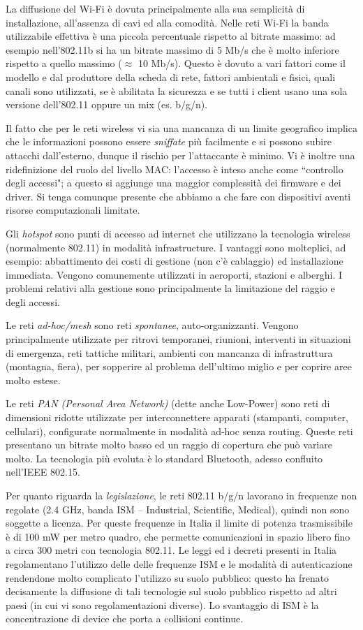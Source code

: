 La diffusione del Wi-Fi è dovuta principalmente alla sua semplicità di installazione, all'assenza di cavi ed alla comodità. Nelle reti Wi-Fi la banda utilizzabile effettiva è una piccola percentuale rispetto al bitrate massimo: ad esempio nell'802.11b si ha un bitrate massimo di 5 Mb/s che è molto inferiore rispetto a quello massimo ($\approx$ 10 Mb/s). Questo è dovuto a vari fattori come il modello e dal produttore della scheda di rete, fattori ambientali e fisici, quali canali sono utilizzati, se è abilitata la sicurezza e se tutti i client usano una sola versione dell'802.11 oppure un mix (es. b/g/n).

Il fatto che per le reti wireless vi sia una mancanza di un limite geografico implica che le informazioni possono essere \textit{sniffate} più facilmente e si possono subire attacchi dall'esterno, dunque il rischio per l'attaccante è minimo. Vi è inoltre una ridefinizione del ruolo del livello MAC: l'accesso è inteso anche come \textquotedblleft controllo degli accessi"; a questo si aggiunge una maggior complessità dei firmware e dei driver. Si tenga comunque presente che abbiamo a che fare con dispositivi aventi risorse computazionali limitate.

Gli \textit{hotspot} sono punti di accesso ad internet che utilizzano la tecnologia wireless (normalmente 802.11) in modalità infrastructure. I vantaggi sono molteplici, ad esempio: abbattimento dei costi di gestione (non c'è cablaggio) ed installazione immediata. Vengono comunemente utilizzati in aeroporti, stazioni e alberghi. I problemi relativi alla gestione sono principalmente la limitazione del raggio e degli accessi.

Le reti \textit{ad-hoc/mesh} sono reti \textit{spontanee}, auto-organizzanti. Vengono principalmente utilizzate per ritrovi temporanei, riunioni, interventi in situazioni di emergenza, reti tattiche militari, ambienti con mancanza di infrastruttura (montagna, fiera), per sopperire al problema dell'ultimo miglio e per coprire aree molto estese.

Le reti \textit{PAN (Personal Area Network)} (dette anche Low-Power) sono reti di dimensioni ridotte utilizzate per interconnettere apparati (stampanti, computer, cellulari), configurate normalmente in modalità ad-hoc senza routing. Queste reti presentano un bitrate molto basso ed un raggio di copertura che può variare molto. La tecnologia più evoluta è lo standard Bluetooth, adesso confluito nell'IEEE 802.15.

Per quanto riguarda la \textit{legislazione}, le reti 802.11 b/g/n lavorano in frequenze non regolate (2.4 GHz, banda ISM -- Industrial, Scientific, Medical), quindi non sono soggette a licenza. Per queste frequenze in Italia il limite di potenza trasmissibile è di 100 mW per metro quadro, che permette comunicazioni in spazio libero fino a circa 300 metri con tecnologia 802.11. Le leggi ed i decreti presenti in Italia regolamentano l'utilizzo delle delle frequenze ISM e le modalità di autenticazione rendendone molto complicato l'utilizzo su suolo pubblico: questo ha frenato decisamente la diffusione di tali tecnologie sul suolo pubblico rispetto ad altri paesi (in cui vi sono regolamentazioni diverse). Lo svantaggio di ISM è la concentrazione di device che porta a collisioni continue.

